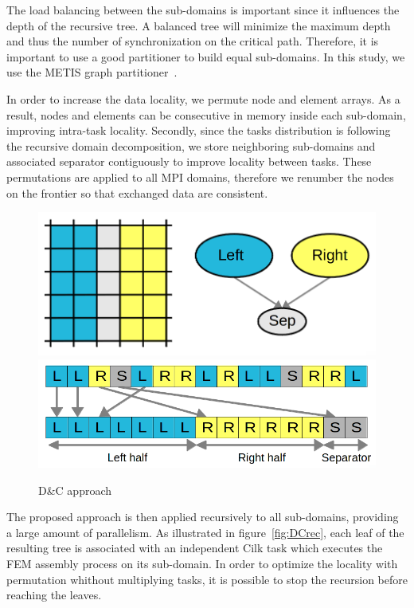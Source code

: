 \documentclass{IOS-Book-Article}
\begin{document}
The load balancing between the sub-domains is important since it influences the depth of the recursive tree.
A balanced tree will minimize the maximum depth and thus the number of synchronization on the critical path.
Therefore, it is important to use a good partitioner to build equal sub-domains. In this study, we use the METIS graph partitioner~\cite{Metis}.

In order to increase the data locality, we permute node and element arrays.
As a result, nodes and elements can be consecutive in memory inside each sub-domain, improving intra-task locality.
Secondly, since the tasks distribution is following the recursive domain decomposition, we store neighboring sub-domains and associated separator contiguously
to improve locality between tasks.
These permutations are applied to all MPI domains, therefore we renumber the nodes on the frontier so that exchanged data are consistent.
\begin{figure}[htp]
 \centering
 \includegraphics[scale=0.17]{DC_approach.png}
 \includegraphics[scale=0.21]{Data_permutations.png}
 \caption{D\&C approach}
 \label{fig:DCapp}
\end{figure}

The proposed approach is then applied recursively to all sub-domains, providing a large amount of parallelism.
As illustrated in figure~\ref{fig:DCrec}, each leaf of the resulting tree is associated with an independent Cilk task which executes the FEM assembly process on its sub-domain.
In order to optimize the locality with permutation whithout multiplying tasks, it is possible to stop the recursion before reaching the leaves.
\end{document}
